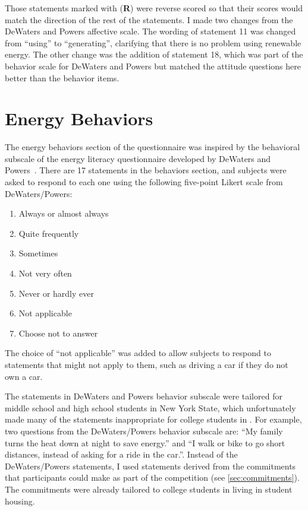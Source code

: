 Those statements marked with (\textbf{R}) were reverse scored so that their scores would match the direction of the rest of the statements. I made two changes from the DeWaters and Powers affective scale. The wording of statement 11 was changed from ``using'' to ``generating'', clarifying that there is no problem using renewable energy. The other change was the addition of statement 18, which was part of the behavior scale for DeWaters and Powers but matched the attitude questions here better than the behavior items.


\section{Energy Behaviors}
\label{sec:behavior-items}

The energy behaviors section of the questionnaire was inspired by the behavioral subscale of the energy literacy questionnaire developed by DeWaters and Powers~\cite{DeWaters2011}. There are 17 statements in the behaviors section, and subjects were asked to respond to each one using the following five-point Likert scale from DeWaters/Powers:

\begin{enumerate}
	\item Always or almost always
	\item Quite frequently
	\item Sometimes
	\item Not very often
	\item Never or hardly ever
	\item Not applicable
	\item Choose not to answer
\end{enumerate}

The choice of ``not applicable'' was added to allow subjects to respond to statements that might not apply to them, such as driving a car if they do not own a car.

The statements in DeWaters and Powers behavior subscale were tailored for middle school and high school students in New York State, which unfortunately made many of the statements inappropriate for college students in \Hawaii. For example, two questions from the DeWaters/Powers behavior subscale are: ``My family turns the heat down at night to save energy.'' and ``I walk or bike to go short distances, instead of asking for a ride in the car.''. Instead of the DeWaters/Powers statements, I used statements derived from the commitments that participants could make as part of the competition (see \autoref{sec:commitments}). The commitments were already tailored to college students in \Hawaii living in student housing. 

